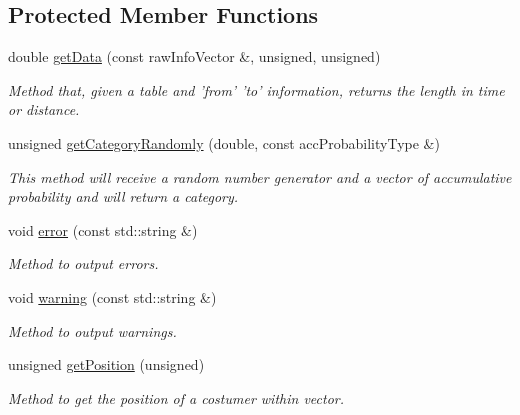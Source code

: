 \subsection*{Protected Member Functions}
\begin{DoxyCompactItemize}
\item 
double \hyperlink{class_v_r_p_t_w_instance_generator_a1abe083477cb63ae7bcd548789308357}{getData} (const rawInfoVector \&, unsigned, unsigned)
\begin{DoxyCompactList}\small\item\em Method that, given a table and 'from' 'to' information, returns the length in time or distance. \item\end{DoxyCompactList}\item 
unsigned \hyperlink{class_v_r_p_t_w_instance_generator_a9403e90055f5b3d4954e680f1824ce16}{getCategoryRandomly} (double, const accProbabilityType \&)
\begin{DoxyCompactList}\small\item\em This method will receive a random number generator and a vector of accumulative probability and will return a category. \item\end{DoxyCompactList}\item 
void \hyperlink{class_v_r_p_t_w_instance_generator_a9afc1fec37ac72840ea894c430615f1e}{error} (const std::string \&)
\begin{DoxyCompactList}\small\item\em Method to output errors. \item\end{DoxyCompactList}\item 
void \hyperlink{class_v_r_p_t_w_instance_generator_a144b7e9da2be3fa8e9d25ae4f4f9ac2e}{warning} (const std::string \&)
\begin{DoxyCompactList}\small\item\em Method to output warnings. \item\end{DoxyCompactList}\item 
unsigned \hyperlink{class_v_r_p_t_w_instance_generator_aed2ef0d942273523273b8c24281fae34}{getPosition} (unsigned)
\begin{DoxyCompactList}\small\item\em Method to get the position of a costumer within vector. \item\end{DoxyCompactList}\item 

\end{DoxyCompactItemize}
